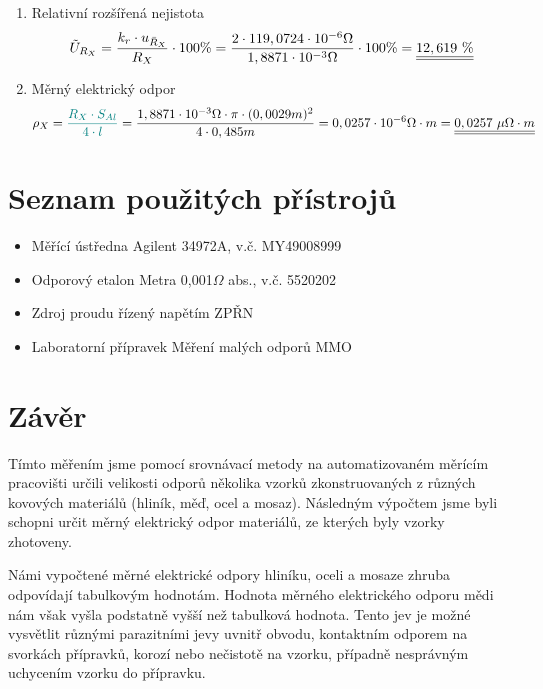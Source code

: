 \documentclass[a4paper, czech]{article}
\begin{document}
\begin{enumerate}
    \item Relativní rozšířená nejistota
    \begin{multline*}
        \tilde{U}_{R_X} = \frac{k_r \cdot u_{\bar{R}_X}}{R_X} \cdot 100 \% = \frac{2 \cdot 119,0724 \cdot 10^{-6} \Omega}{1,8871 \cdot 10^{-3} \Omega} \cdot 100 \% = \underline{\underline{12,619\ \%}} \hfill
    \end{multline*}

    \item Měrný elektrický odpor
    \begin{multline*}
        \rho_X = \textcolor{teal}{\frac{R_X \cdot S_{Al}}{4 \cdot l}} = \frac{1,8871 \cdot 10^{-3} \Omega \cdot \pi \cdot (0,0029m)^2}{4 \cdot 0,485m} = 0,0257 \cdot 10^{-6} \Omega \cdot m = \underline{\underline{0,0257\ \mu \Omega \cdot m}} \hfill
    \end{multline*}
\end{enumerate}

\section{Seznam použitých přístrojů}

\begin{itemize}
    \item Měřící ústředna Agilent 34972A, v.č. MY49008999
    \item Odporový etalon Metra 0,001$\Omega$ abs., v.č. 5520202
    \item Zdroj proudu řízený napětím ZPŘN
    \item Laboratorní přípravek Měření malých odporů MMO
\end{itemize}

\section{Závěr}

Tímto měřením jsme pomocí srovnávací metody na automatizovaném měrícím pracovišti určili velikosti odporů několika vzorků zkonstruovaných z různých kovových materiálů (hliník, měď, ocel a mosaz).
Následným výpočtem jsme byli schopni určit měrný elektrický odpor materiálů, ze kterých byly vzorky zhotoveny.

Námi vypočtené měrné elektrické odpory hliníku, oceli a mosaze zhruba odpovídají tabulkovým hodnotám.
Hodnota měrného elektrického odporu mědi nám však vyšla podstatně vyšší než tabulková hodnota.
Tento jev je možné vysvětlit různými parazitními jevy uvnitř obvodu, kontaktním odporem na svorkách přípravků, korozí nebo nečistotě na vzorku, případně nesprávným uchycením vzorku do přípravku.
\end{document}
